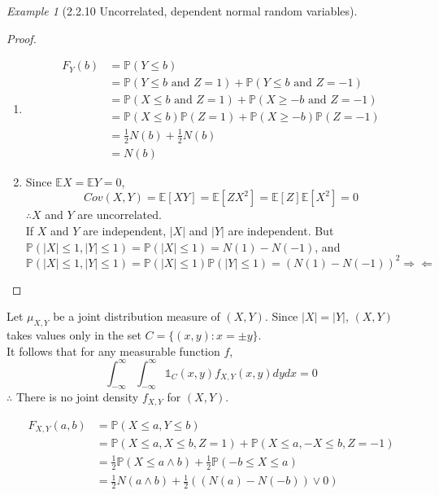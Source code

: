 \documentclass[12pt]{report}
\renewcommand{\1}{\mathbb{1}}
\theoremstyle{break}
\theoremstyle{newdef}
\theoremstyle{remark}
\newtheorem*{exmp}{Example} %
\begin{document}
\begin{appendices}
\begin{exmp}[2.2.10 Uncorrelated, dependent normal random variables]
\begin{proof}
\leavevmode
\begin{enumerate}
\item
$$
\begin{aligned}
F_Y(b) &= \mathbb{P}(Y \leq b)\\
&= \mathbb{P}(Y \leq b \text{ and } Z = 1)
+ \mathbb{P}(Y \leq b \text{ and } Z = -1)\\
&= \mathbb{P}(X \leq b \text{ and } Z = 1)
+ \mathbb{P}(X \geq -b \text{ and } Z = -1)\\
&= \mathbb{P}(X \leq b)\mathbb{P}(Z=1)
+ \mathbb{P}(X \geq -b)\mathbb{P}(Z=-1)\\
&= \frac{1}{2}N(b) + \frac{1}{2}N(b)\\
&=N(b)
\end{aligned}
$$

\item
Since $\mathbb{E}X = \mathbb{E}Y = 0$,
$$Cov(X,Y) = \mathbb{E}[XY] = \mathbb{E}[ZX^2] = \mathbb{E}[Z]\mathbb{E}[X^2] = 0$$
$\therefore X$ and $Y$ are uncorrelated.\\
If $X$ and $Y$ are independent, $|X|$ and $|Y|$ are independent.
But $\mathbb{P}(|X| \leq 1, |Y| \leq 1) = \mathbb{P}(|X| \leq 1) = N(1) - N(-1)$, and $\mathbb{P}(|X| \leq 1, |Y| \leq 1) = \mathbb{P}(|X| \leq 1) \mathbb{P}(|Y| \leq 1) = (N(1)-N(-1))^2
\Rightarrow\!\Leftarrow$

\end{enumerate}
\end{proof}

Let $\mu_{X,Y}$ be a joint distribution measure of $(X,Y)$.
Since $|X| = |Y|$, $(X,Y)$ takes values only in the set
$C = \{(x,y): x = \pm y\}$.\\
It follows that for any measurable function $f$,
$$
\int_{-\infty}^\infty \int_{-\infty}^\infty \mathbb{1}_C(x,y) f_{X,Y}(x,y) dydx = 0
$$
$\therefore$ There is no joint density $f_{X,Y}$ for $(X,Y)$.


$$
\begin{aligned}
F_{X,Y}(a,b) &= \mathbb{P}(X \leq a, Y \leq b)\\
&= \mathbb{P}(X \leq a, X \leq b, Z = 1) + \mathbb{P}(X \leq a, -X \leq b, Z = -1)\\
&= \frac{1}{2} \mathbb{P}(X \leq a \wedge b) + \frac{1}{2}\mathbb{P}(-b \leq X \leq a)\\
&= \frac{1}{2} N(a \wedge b) + \frac{1}{2} ((N(a)-N(-b)) \vee 0)
\end{aligned}
$$
\end{exmp}


\end{appendices}
\end{document}
